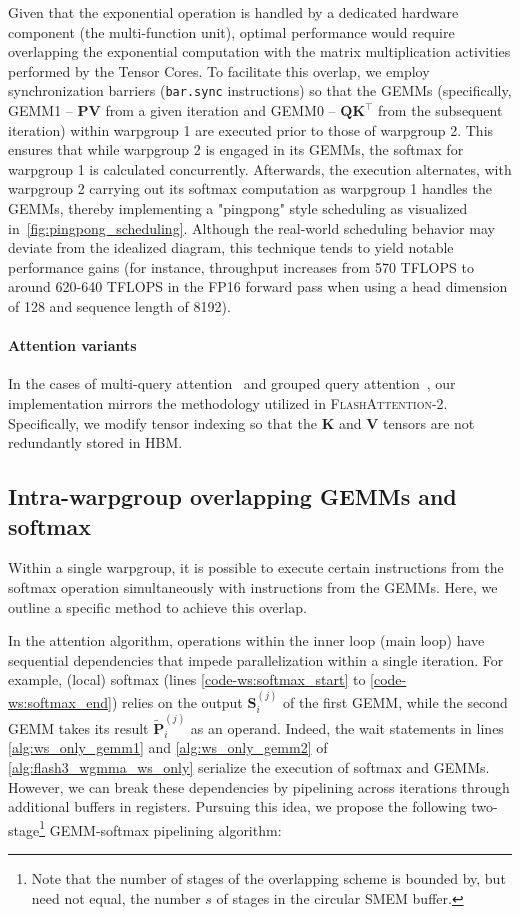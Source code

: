 Given that the exponential operation is handled by a dedicated hardware component (the multi-function unit), optimal performance would require overlapping the exponential computation with the matrix multiplication activities performed by the Tensor Cores. To facilitate this overlap, we employ synchronization barriers (\texttt{bar.sync} instructions) so that the GEMMs (specifically, GEMM1 -- $\mathbf{P} \mathbf{V}$ from a given iteration and GEMM0 -- $\mathbf{Q} \mathbf{K}^\top$ from the subsequent iteration) within warpgroup 1 are executed prior to those of warpgroup 2. This ensures that while warpgroup 2 is engaged in its GEMMs, the softmax for warpgroup 1 is calculated concurrently. Afterwards, the execution alternates, with warpgroup 2 carrying out its softmax computation as warpgroup 1 handles the GEMMs, thereby implementing a "pingpong" style scheduling as visualized in~\cref{fig:pingpong_scheduling}. Although the real-world scheduling behavior may deviate from the idealized diagram, this technique tends to yield notable performance gains (for instance, throughput increases from 570 TFLOPS to around 620-640 TFLOPS in the FP16 forward pass when using a head dimension of 128 and sequence length of 8192).

\paragraph{Attention variants} In the cases of multi-query attention~\citep{shazeer2019fast} and grouped query attention~\citep{ainslie2023gqa}, our implementation mirrors the methodology utilized in \textsc{FlashAttention-2}. Specifically, we modify tensor indexing so that the $\mathbf{K}$ and $\mathbf{V}$ tensors are not redundantly stored in HBM.

\subsection{Intra-warpgroup overlapping GEMMs and softmax}

Within a single warpgroup, it is possible to execute certain instructions from the softmax operation simultaneously with instructions from the GEMMs. Here, we outline a specific method to achieve this overlap.

In the attention algorithm, operations within the inner loop (main loop) have sequential dependencies that impede parallelization within a single iteration. For example, (local) softmax (lines \ref{code-ws:softmax_start} to \ref{code-ws:softmax_end}) relies on the output $\mathbf{S}_i^{(j)}$ of the first GEMM, while the second GEMM takes its result $\widetilde{\mathbf{P}}_i^{(j)}$ as an operand. Indeed, the wait statements in lines \ref{alg:ws_only_gemm1} and \ref{alg:ws_only_gemm2} of \cref{alg:flash3_wgmma_ws_only} serialize the execution of softmax and GEMMs. However, we can break these dependencies by pipelining across iterations through additional buffers in registers. Pursuing this idea, we propose the following two-stage\footnote{Note that the number of stages of the overlapping scheme is bounded by, but need not equal, the number $s$ of stages in the circular SMEM buffer.} GEMM-softmax pipelining algorithm:

